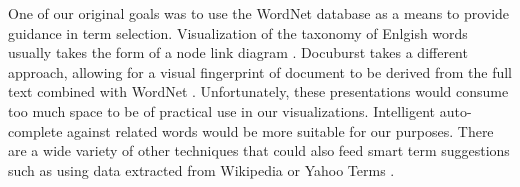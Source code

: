 One of our original goals was to use the WordNet database as a means to provide guidance in term selection.  Visualization of the taxonomy of Enlgish words usually takes the form of a node link diagram \cite{collins2006wordnet,wordvis}.  Docuburst takes a different approach, allowing for a visual fingerprint of document to be derived from the full text combined with WordNet \cite{fellbaum2010wordnet}.  Unfortunately, these presentations would consume too much space to be of practical use in our visualizations.  Intelligent auto-complete against related words would be more suitable for our purposes.  There are a wide variety of other techniques that could also feed smart term suggestions such as using data extracted from Wikipedia or Yahoo Terms \cite{dakka2008automatic}.
